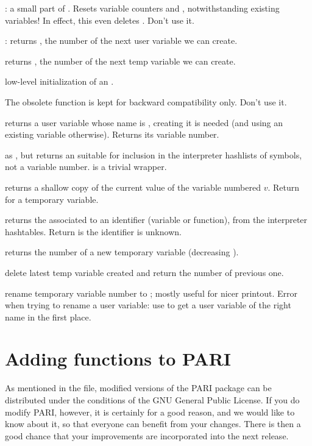 
: a small part of . Resets
variable counters  and , notwithstanding existing
variables! In effect, this even deletes . Don't use it.

: returns , the number of the next user
variable we can create.

 returns , the number of the
next temp variable we can create.

 low-level initialization of an
.

\noindent The obsolete function 
is kept for backward compatibility only. Don't use it.


 returns a user variable whose name
is , creating it is needed (and using an existing variable otherwise).
Returns its variable number.

 as , but
returns an  suitable for inclusion in the interpreter hashlists
of symbols, not a variable number.  is a trivial
wrapper.

 returns a shallow copy of the
current value of the variable numbered $v$. Return  for a temporary
variable.

 returns the  associated
to an identifier  (variable or function), from the interpreter
hashtables. Return  is the identifier is unknown.


 returns the number of a new temporary variable
(decreasing ).

 delete latest temp variable created and return
the number of previous one.

 rename temporary variable number
 to ; mostly useful for nicer printout. Error when trying to
rename a user variable: use  to get a user variable of
the right name in the first place.

\section{Adding functions to PARI}
%
As mentioned in the  file, modified versions of the PARI package
can be distributed under the conditions of the GNU General Public License. If
you do modify PARI, however, it is certainly for a good reason, and we
would like to know about it, so that everyone can benefit from your changes.
There is then a good chance that your improvements are incorporated into the
next release.

